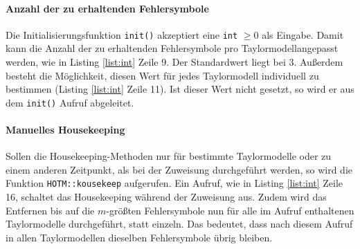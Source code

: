 \paragraph{Anzahl der zu erhaltenden Fehlersymbole}
Die Initialisierungsfunktion \verb+init()+ akzeptiert eine \verb+int+ $\geq 0$ als Eingabe. Damit kann die Anzahl der zu erhaltenden Fehlersymbole pro Taylormodellangepasst werden, wie in  Listing \ref{list:int} Zeile 9. Der Standardwert liegt bei 3. Außerdem besteht die Möglichkeit, diesen Wert für jedes Taylormodell individuell zu bestimmen (Listing \ref{list:int} Zeile 11). Ist dieser Wert nicht gesetzt, so wird er aus dem \verb+init()+ Aufruf abgeleitet.

\paragraph{Manuelles Housekeeping}
 Sollen die Housekeeping-Methoden nur für bestimmte Taylormodelle oder zu einem anderen Zeitpunkt, als bei der Zuweisung durchgeführt werden, so wird die Funktion \verb+HOTM::kousekeep+ aufgerufen. Ein Aufruf, wie in Listing \ref{list:int} Zeile 16, schaltet das Housekeeping während der Zuweisung aus. Zudem wird das Entfernen bis auf die $m$-größten Fehlersymbole nun für alle im Aufruf enthaltenen Taylormodelle durchgeführt, statt einzeln. Das bedeutet, dass nach diesem Aufruf in allen Taylormodellen dieselben Fehlersymbole übrig bleiben.
 
 
 
